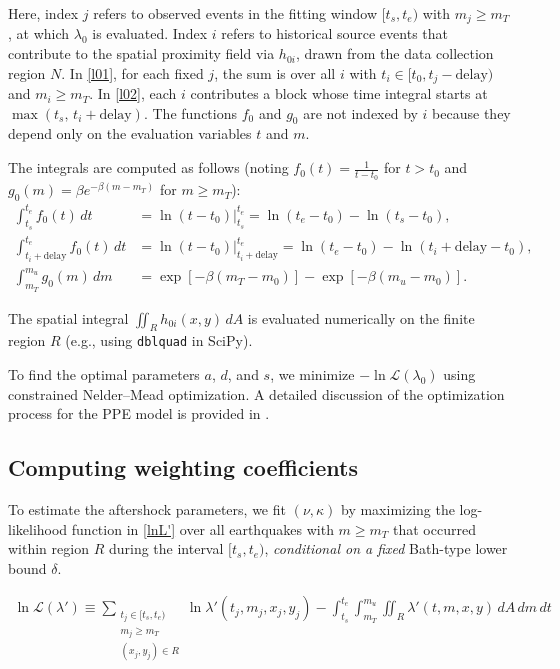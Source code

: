 \documentclass[linenum,doublespace,onecolumn]{SSA-SRL}
\theoremstyle{lemma}
\begin{document}
Here, index $j$ refers to observed events in the fitting window $[t_s, t_e)$ with $m_j \ge m_T$, at which $\lambda_0$ is evaluated. Index $i$ refers to historical source events that contribute to the spatial proximity field via $h_{0i}$, drawn from the data collection region $N$. In \eqref{l01}, for each fixed $j$, the sum is over all $i$ with $t_i \in [t_0, t_j - \text{delay})$ and $m_i \ge m_T$. In \eqref{l02}, each $i$ contributes a block whose time integral starts at $\max(t_s,\, t_i + \text{delay})$. The functions $f_0$ and $g_0$ are not indexed by $i$ because they depend only on the evaluation variables $t$ and $m$.

The integrals are computed as follows (noting $f_0(t) = \frac{1}{t - t_0}$ for $t > t_0$ and $g_0(m) = \beta e^{-\beta(m - m_T)}$ for $m \ge m_T$):
\begin{equation}
\begin{aligned}
\int_{t_s}^{t_e} f_0(t)\, dt &= \ln(t - t_0)\bigg|_{t_s}^{t_e} 
= \ln(t_e - t_0) - \ln(t_s - t_0), \\
\int_{t_i + \text{delay}}^{t_e} f_0(t)\, dt 
&= \ln(t - t_0)\bigg|_{t_i + \text{delay}}^{t_e} 
= \ln(t_e - t_0) - \ln(t_i + \text{delay} - t_0), \\
\int_{m_T}^{m_u} g_0(m)\, dm 
&= \exp[-\beta(m_T - m_0)] - \exp[-\beta(m_u - m_0)].
\end{aligned}
\end{equation}

The spatial integral $\iint_R h_{0i}(x,y)\, dA$ is evaluated numerically on the finite region $R$ (e.g., using \texttt{dblquad} in SciPy).

To find the optimal parameters $a$, $d$, and $s$, we minimize $-\ln \mathcal{L}(\lambda_0)$ using constrained Nelder–Mead optimization. A detailed discussion of the optimization process for the PPE model is provided in .


\subsection{Computing weighting coefficients}

To estimate the aftershock parameters, we fit $(\nu, \kappa)$ by maximizing the log-likelihood function in \eqref{lnL'} over all earthquakes with $m \ge m_T$ that occurred within region $R$ during the interval $[t_s, t_e)$, \emph{conditional on a fixed} Bath-type lower bound $\delta$.

\begin{equation}\label{lnL'}
\begin{aligned}
\ln{\mathcal{L}(\lambda')} \equiv \sum_{\substack{t_j \in [t_s,t_e)\\ m_j \ge m_T\\ (x_j,y_j) \in R}} \!\! \ln{\lambda'(t_j,m_j,x_j,y_j)} 
- \int_{t_s}^{t_e} \int_{m_T}^{m_u} \iint_{R} \lambda'(t,m,x,y)\, dA\, dm\, dt
\end{aligned}
\end{equation}
\end{document}
